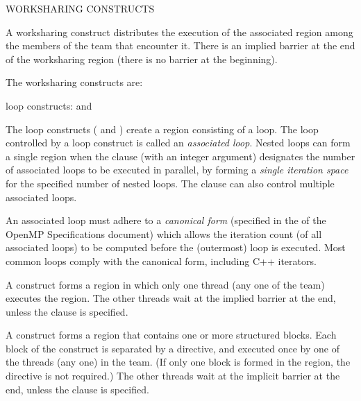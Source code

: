 \bigskip
WORKSHARING CONSTRUCTS

A worksharing construct distributes the execution of the associated region
among the members of the team that encounter it.  There is an
implied barrier at the end of the worksharing region
(there is no barrier at the beginning). 

\newpage
The worksharing constructs are:

\begin{compactitem}

\item loop constructs: { and  }
\item {}
\item {}
\item {}

\end{compactitem}

The loop constructs ( and ) create a region 
consisting of a loop.  The loop controlled by a loop construct is called 
an \emph{associated loop}.  Nested loops can form a single region when the 
 clause (with an integer argument) designates the number of 
associated loops to be executed in parallel, by forming a 
\emph{single iteration space} for the specified number of nested loops.
The  clause can also control multiple associated loops.

An associated loop must adhere to a \emph{canonical form} (specified in the
 of the OpenMP Specifications document) which allows the 
iteration count (of all associated loops) to be computed before the 
(outermost) loop is executed. %
Most common loops comply with the canonical form, including C++ iterators.

A  construct forms a region in which only one thread (any one 
of the team) executes the region. 
The other threads wait at the implied 
barrier at the end, unless the  clause is specified.

A  construct forms a region that contains one or more 
structured blocks.  Each block of the  construct is 
separated by a  directive, and executed once by 
one of the threads (any one) in the team.  (If only one block is 
formed in the region, the  directive is not required.)
The other threads wait at the implicit 
barrier at the end, unless the  clause is specified.


